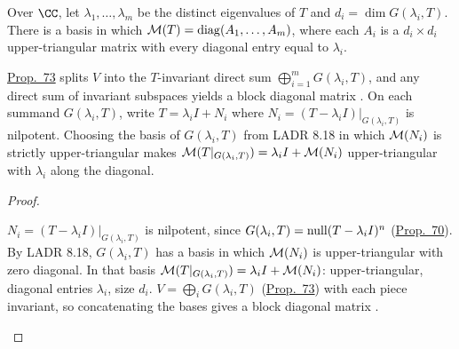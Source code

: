 \documentclass[10pt]{scrartcl}
\begin{document}
\begin{theorem*}\hypertarget{name-ladr-8-37-block-diagonal-form}{}\label{name-ladr-8-37-block-diagonal-form}
  Over $\CC$, let $\lambda_1,\dots,\lambda_m$ be the distinct eigenvalues of $T$ and $d_i=\dim G(\lambda_i,T)$. There is a basis in which $\mathcal M(T)=\operatorname{diag}(A_1,\dots,A_m)$, where each $A_i$ is a $d_i\times d_i$ upper-triangular matrix with every diagonal entry equal to $\lambda_i$.
\end{theorem*}
\begin{ideabox}
\hyperref[prop-73]{Prop.~73} splits $V$ into the $T$-invariant direct sum $\bigoplus_{i=1}^m G(\lambda_i,T)$, and any direct sum of invariant subspaces yields a block diagonal matrix . On each summand $G(\lambda_i,T)$, write $T=\lambda_iI+N_i$ where $N_i=(T-\lambda_iI)|_{G(\lambda_i,T)}$ is nilpotent. Choosing the basis of $G(\lambda_i,T)$ from LADR 8.18 in which $\mathcal M(N_i)$ is strictly upper-triangular makes $\mathcal M(T|_{G(\lambda_i,T)})=\lambda_iI+\mathcal M(N_i)$ upper-triangular with $\lambda_i$ along the diagonal.
\end{ideabox}
\begin{proof}
  \begin{steps}
    \ii $N_i=(T-\lambda_iI)|_{G(\lambda_i,T)}$ is nilpotent, since $G(\lambda_i,T)=\operatorname{null}(T-\lambda_iI)^n$ (\hyperref[prop-70]{Prop.~70}). By LADR 8.18, $G(\lambda_i,T)$ has a basis in which $\mathcal M(N_i)$ is upper-triangular with zero diagonal.
    \ii In that basis $\mathcal M(T|_{G(\lambda_i,T)})=\lambda_iI+\mathcal M(N_i)$: upper-triangular, diagonal entries $\lambda_i$, size $d_i$.
    \ii $V=\bigoplus_iG(\lambda_i,T)$ (\hyperref[prop-73]{Prop.~73}) with each piece invariant, so concatenating the bases gives a block diagonal matrix .
  \end{steps}
\end{proof}
\end{document}
